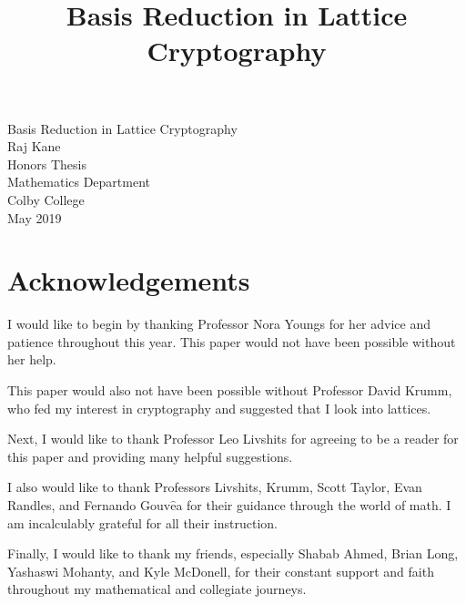 \documentclass[a4paper,12pt]{article}
\title{\vspace{-40pt} Basis Reduction in Lattice Cryptography}
\begin{document}
\vspace{-45pt}
\begin{titlepage}
    \begin{center}
        \vspace*{5cm}%
        {\LARGE Basis Reduction in Lattice Cryptography}\\[1cm]
        {\normalsize Raj Kane}\\[0.5cm]
        {\normalsize Honors Thesis}\\[0.5cm]
        {\normalsize Mathematics Department}\\[0.5cm]
        {\normalsize Colby College}\\[0.5cm]
        {\normalsize May 2019}\\[0.5cm]
    \end{center}
    \let\newpage\relax%
\end{titlepage}
\newpage
\tableofcontents
\clearpage

\section{Acknowledgements}

I would like to begin by thanking Professor Nora Youngs for her advice and patience throughout this year. This paper would not have been possible without her help. 

This paper would also not have been possible without Professor David Krumm, who fed my interest in cryptography and suggested that I look into lattices.

Next, I would like to thank Professor Leo Livshits for agreeing to be a reader for this paper and providing many helpful suggestions.

I also would like to thank Professors Livshits, Krumm, Scott Taylor, Evan Randles, and Fernando Gouv$\hat{\text{e}}$a for their guidance through the world of math. I am incalculably grateful for all their instruction.

Finally, I would like to thank my friends, especially Shabab Ahmed, Brian Long, Yashaswi Mohanty, and Kyle McDonell, for their constant support and faith throughout my mathematical and collegiate journeys. 

\newpage

\end{document}
